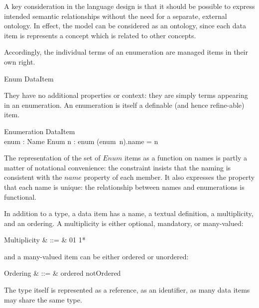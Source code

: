 \documentclass{article}
\def\optional{0{\upto}1}
\def\mandatory{1{\upto} 1}
\def\many{0{\upto}*}
\begin{document}
		A key consideration in the language design is that it should be possible to express intended semantic relationships without the need for a separate, external ontology. In effect, the model can be considered as an ontology, since each data item is represents a concept which is related to other concepts.  
		
		
		Accordingly, the individual terms of an enumeration are managed items in their own right.
		\begin{schema}{Enum}
			DataItem 
		\end{schema}
		They have no additional properties or context: they are simply terms appearing in an enumeration.   An enumeration is itself a definable (and hence refine-able) item. 
		\begin{schema}{Enumeration}
			DataItem \\
			enum : Name \pfun Enum
			\where
			\forall n : \dom enum \spot (enum~n).name = n 
		\end{schema}
		The representation of the set of $Enum$ items as a function on names is partly a matter of notational convenience: the constraint insists that the naming is consistent with the $name$ property of each member. It also expresses the property that each name is unique: the relationship between names and enumerations is functional. 
		
		In addition to a type, a data item has a name, a textual definition, a multiplicity, and an ordering.  A multiplicity is either optional, mandatory, or many-valued:
		\begin{syntax}
			Multiplicity & ::= & \optional \mid \mandatory \mid \many 
		\end{syntax}
		and a many-valued item can be either ordered or unordered:
		\begin{syntax}
			Ordering & ::= & ordered \mid notOrdered 
		\end{syntax}
		The type itself is represented as a reference, as an identifier, as many data items may share the same type. 
		
\end{document}
